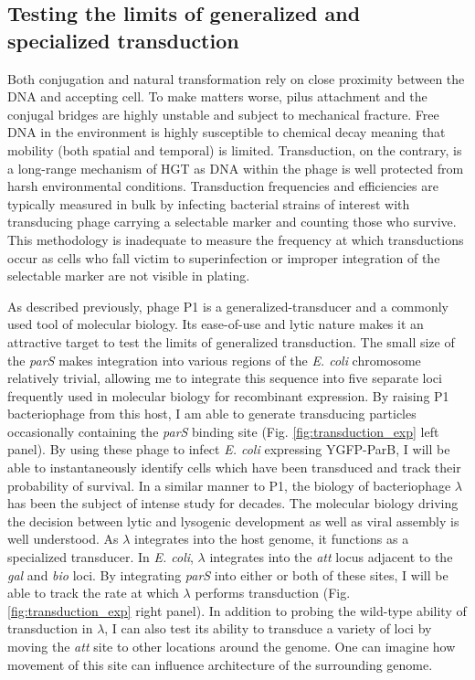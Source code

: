 \subsection*{Testing the limits of generalized and specialized transduction}
\indent Both conjugation and natural transformation rely on close proximity between the
DNA and accepting cell. To make matters worse, pilus attachment and the conjugal
bridges are highly unstable and subject to mechanical fracture. Free DNA in the
environment is highly susceptible to chemical decay meaning that mobility (both
spatial and temporal) is limited. Transduction, on the contrary, is a long-range
mechanism of HGT as DNA within the phage is well protected from harsh
environmental conditions. Transduction frequencies and efficiencies are
typically measured in bulk by infecting bacterial strains of interest with
transducing phage carrying a selectable marker and counting those who survive.
This methodology is inadequate to measure the frequency at which transductions
occur as cells who fall victim to superinfection or improper integration of the
selectable marker are not visible in plating. 

As described previously, phage P1 is a generalized-transducer and a commonly used
tool of molecular biology. Its ease-of-use and lytic nature makes it an
attractive target to test the limits of generalized transduction. The small size
of the \textit{parS} makes integration into various regions of the
\textit{E. coli} chromosome relatively trivial, allowing me to integrate this sequence
into five separate loci frequently used in molecular biology for recombinant expression. By
raising P1 bacteriophage from this host, I am able to generate transducing particles
occasionally containing the \textit{parS} binding site
(Fig. \ref{fig:transduction_exp} left panel).  By using these phage to
infect \textit{E. coli} expressing YGFP-ParB, I will be able to instantaneously
identify cells which have been transduced and track their probability of
survival.  In a similar manner to P1, the biology of bacteriophage $\lambda$ has
been the subject of intense study for decades. The molecular biology driving the
decision between lytic and lysogenic development as well as viral assembly is
well understood. As $\lambda$ integrates into the host genome, it functions as a
specialized transducer. In \textit{E. coli}, $\lambda$ integrates into the
\textit{att} locus adjacent to the \textit{gal} and \textit{bio} loci. By
integrating \textit{parS} into either or both of these sites, I will be able to 
track the rate at which $\lambda$ performs transduction (Fig.
\ref{fig:transduction_exp} right panel). 
In addition to probing the wild-type ability of
transduction in $\lambda$, I can also test its ability to transduce a variety
of loci by moving the \textit{att} site to other locations around the genome.
One can imagine how movement of this site can influence architecture of the
surrounding genome. 

